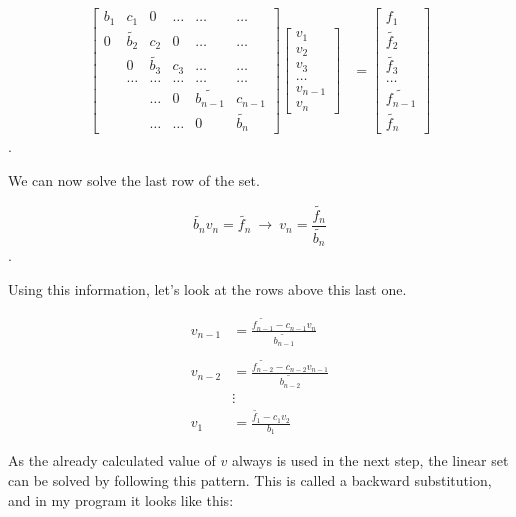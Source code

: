 \documentclass[a4paper,norsk,12pt,oneside]{article}
\begin{document}
\begin{align}\label{eq:general}
	\label{full eq Ax=f}	
	\begin{bmatrix}
        b_{1} & c_{1} & 0 & \hdots & \hdots & \hdots \\
        0 & \tilde{b_{2}} & c_{2} & 0 & \hdots & \hdots \\
        & 0 & \tilde{b_{3}} & c_{3} & \hdots & \hdots \\
		& \hdots & \hdots & \hdots & \hdots & \hdots \\ 
        && \hdots & 0 & \tilde{b_{n-1}} & c_{n-1} \\
        && \hdots & \hdots & 0 & \tilde{b_{n}} 
	\end{bmatrix} \begin{bmatrix}
	v_1 \\ v_2 \\ v_3 \\ \hdots \\ v_{n-1} \\ v_n
	\end{bmatrix} &= \begin{bmatrix}
        {f_1} \\ \tilde{f_2} \\ \tilde{f_3} \\ \hdots \\ \tilde{f_{n-1}} \\ \tilde{f_n}
	\end{bmatrix}
\end{align}.   

We can now solve the last row of the set.

\begin{equation*}
    \tilde{b_n} v_n = \tilde{f_n} \ \rightarrow \ v_n = \frac{\tilde{f_n}}{\tilde{b_n}} 
\end{equation*}. 

Using this information, let's look at the rows above this last one. 

\begin{align*}
    v_{n-1} &= \frac{\tilde{f_{n-1}} - c_{n-1}v_n}{\tilde{b_{n-1}}}\\\\
    v_{n-2} &= \frac{\tilde{f_{n-2}} - c_{n-2}v_{n-1}}{\tilde{b_{n-2}}}\\
    &\vdots \\
    v_1 &= \frac{\tilde{f_1} - c_1v_2}{b_1}
\end{align*}

As the already calculated value of \(v\) always is used in the next step, the linear set
can be solved by following this pattern. This is called a backward substitution, and in my program
it looks like this: 
\end{document}
